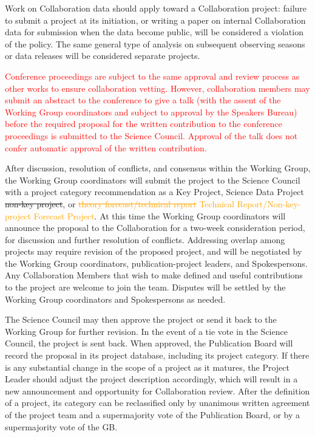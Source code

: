 \documentclass[12pt]{article}
\newcommand{\revision}[1]{\textcolor{Red}{#1}}
\newcommand{\revtwo}[1]{\textcolor{Emerald}{#1}}
\newcommand{\revthree}[1]{\textcolor{Orange}{#1}}
\begin{document}
Work on Collaboration data should apply toward a Collaboration project: failure to submit a project at its initiation, or writing a paper on internal Collaboration data for submission when the data become public, will be considered a violation of the policy.  The same general type of analysis on subsequent observing seasons or data releases will be considered separate projects.

\revision{Conference proceedings are subject to the same approval and review process as other works to ensure collaboration vetting.  However, collaboration members may submit an abstract to the conference to give a talk (with the assent of the Working Group coordinators and subject to approval by the Speakers Bureau) before the required proposal for the written contribution to the conference proceedings is submitted to the Science Council.  Approval of the talk does not confer automatic approval of the written contribution.}

After discussion, resolution of conflicts, and consensus within the Working Group, the Working Group coordinators will submit the project to the Science Council with a project category recommendation as a Key Project, \revtwo{Science Data Project \sout{non-key project}}, or \revthree{\sout{theory forecast/technical report} Technical Report/Non-key-project Forecast Project}.  At this time the Working Group coordinators will announce the proposal to the Collaboration for a two-week consideration period, for discussion and further resolution of conflicts.  Addressing overlap among projects may require revision of the proposed project, and will be negotiated by the Working Group coordinators, publication-project leaders, and Spokespersons.  Any Collaboration Members that wish to make defined and useful contributions to the project are welcome to join the team.  Disputes will be settled by the Working Group coordinators and Spokespersons as needed.  

The Science Council may then approve the project or send it back to the Working Group for further revision.  In the event of a tie vote in the Science Council, the project is sent back.  When approved, the Publication Board will record the proposal in its project database, including its project category.  If there is any substantial change in the scope of a project as it matures, the Project Leader should adjust the project description accordingly, which will result in a new announcement and opportunity for Collaboration review.  After the definition of a project, its category can be reclassified only by unanimous written agreement of the project team and a supermajority vote of the Publication Board,  or by a supermajority vote of the GB.
\end{document}
